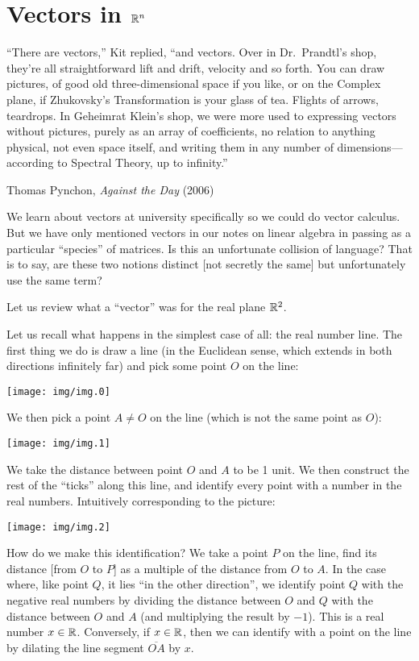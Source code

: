 \section{Vectors in \texorpdfstring{$\mathbb{R}^{n}$}{Rn}}\label{section:vectors-in-r-n}

\epigraph{``There are vectors,'' Kit replied, ``and vectors. Over in Dr.\ Prandtl's shop, they're all straightforward lift and drift, velocity and so forth. You can draw pictures, of good old three-dimensional space if you like, or on the Complex plane, if Zhukovsky's Transformation is your glass of tea. Flights of arrows, teardrops. In Geheimrat Klein's shop, we were more used to expressing vectors without pictures, purely as an array of coefficients, no relation to anything physical, not even space itself, and writing them in any number of dimensions---according to Spectral Theory, up to infinity.''}{Thomas Pynchon, \textit{Against the Day} (2006)}

\M
We learn about vectors at university specifically so we could do vector
calculus. But we have only mentioned vectors in our notes on linear
algebra in passing as a particular ``species'' of matrices. Is this an
unfortunate collision of language? That is to say, are these two notions
distinct [not secretly the same] but unfortunately use the same term?

Let us review what a ``vector'' was for the real plane $\mathbb{R}^{2}$.

Let us recall what happens in the simplest case of all: the real number
line. The first thing we do is draw a line (in the Euclidean sense,
which extends in both directions infinitely far) and pick some point $O$
on the line:
\begin{center}
  \texttt{[image: img/img.0]}
\end{center}
We then pick a point $A\neq O$ on the line (which is not the same point
as $O$):
\begin{center}
  \texttt{[image: img/img.1]}
\end{center}
We take the distance between point $O$ and $A$ to be 1 unit. We then
construct the rest of the ``ticks'' along this line, and identify every
point with a number in the real numbers. Intuitively corresponding to
the picture:
\begin{center}
  \texttt{[image: img/img.2]}
\end{center}
How do we make this identification? We take a point $P$ on the line,
find its distance [from $O$ to $P$] as a multiple of the distance from
$O$ to $A$. In the case where, like point $Q$, it lies ``in the other
direction'', we identify point $Q$ with the negative real numbers by
dividing the distance between $O$ and $Q$ with the distance between $O$
and $A$ (and multiplying the result by $-1$). This is a real number
$x\in\mathbb{R}$. Conversely, if $x\in\mathbb{R}$, then we can identify with a point
on the line by dilating the line segment $\overline{OA}$ by $x$.

